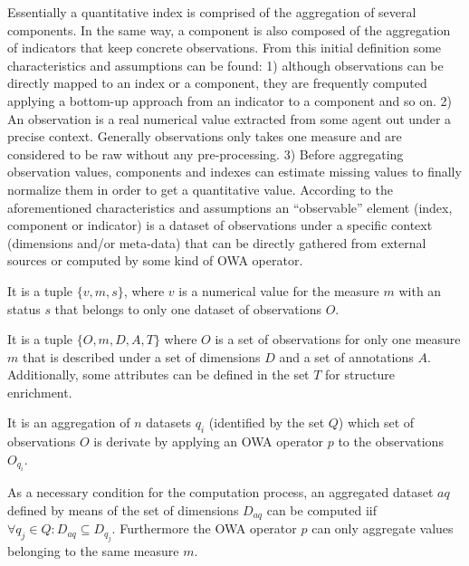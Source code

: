 Essentially a quantitative index is comprised of the aggregation of several components. In the same way, 
a component is also composed of the aggregation of indicators that keep concrete observations. From this initial definition 
some characteristics and assumptions can be found: 1) although observations can be directly mapped to an index or a component, they 
are frequently computed applying a bottom-up approach from an indicator to a component and so on. 2) An observation is 
a real numerical value extracted from some agent out under a precise context. Generally observations only takes one measure and are considered 
to be raw without any pre-processing. 3) Before aggregating observation values, components and indexes can 
estimate missing values to finally normalize them in order to get a quantitative value. According to the aforementioned characteristics and assumptions an ``observable'' element (index, component or indicator) is a 
dataset of observations under a specific context (dimensions and/or meta-data) that can be directly gathered from external 
sources or computed by some kind of OWA operator. 

\begin{definition}[Observation-$o$]\upshape
It is a tuple $\{v,m,s\}$, where $v$ is a numerical value for the measure $m$ with an status $s$ that belongs to 
only one dataset of observations $O$. 
\end{definition}


\begin{definition}[Dataset-$q$]\upshape
It is a tuple $\{O,m,D,A,T\}$ where $O$ is a set of observations for only one measure $m$ that is described under 
a set of dimensions $D$ and a set of annotations $A$. Additionally, some attributes can be defined in the set $T$ for structure enrichment. 
\end{definition}


\begin{definition}\upshape
It is an aggregation of $n$ datasets $q_i$ (identified by the set $Q$) which set of observations $O$ is derivate by applying 
an OWA operator $p$ to the observations $O_{q_i}$. 
\end{definition}

As a necessary condition for the computation process, an aggregated dataset $aq$ defined by means of the set of dimensions $D_{aq}$ can be computed iif 
$\forall q_j \in Q: D_{aq} \subseteq D_{q_j}$. Furthermore the OWA operator $p$ can only aggregate values belonging to the same measure $m$.

